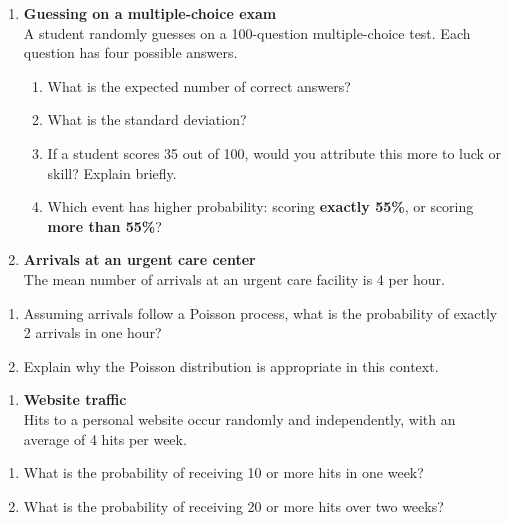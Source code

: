 \documentclass[
  letterpaper,
  DIV=11,
  numbers=noendperiod]{scrreprt}
\providecommand{\tightlist}{%
  \setlength{\itemsep}{0pt}\setlength{\parskip}{0pt}}
\begin{document}
\begin{enumerate}
\def\labelenumi{\arabic{enumi}.}
\setcounter{enumi}{8}
\item
  \textbf{Guessing on a multiple-choice exam}\\
  A student randomly guesses on a 100-question multiple-choice test.
  Each question has four possible answers.

  \begin{enumerate}
  \def\labelenumii{(\alph{enumii})}
  \tightlist
  \item
    What is the expected number of correct answers?\\
  \item
    What is the standard deviation?\\
  \item
    If a student scores 35 out of 100, would you attribute this more to
    luck or skill? Explain briefly.\\
  \item
    Which event has higher probability: scoring \textbf{exactly 55\%},
    or scoring \textbf{more than 55\%}?
  \end{enumerate}
\item
  \textbf{Arrivals at an urgent care center}\\
  The mean number of arrivals at an urgent care facility is 4 per hour.
\end{enumerate}

\begin{enumerate}
\def\labelenumi{(\alph{enumi})}
\tightlist
\item
  Assuming arrivals follow a Poisson process, what is the probability of
  exactly 2 arrivals in one hour?\\
\item
  Explain why the Poisson distribution is appropriate in this context.
\end{enumerate}

\begin{enumerate}
\def\labelenumi{\arabic{enumi}.}
\setcounter{enumi}{10}
\tightlist
\item
  \textbf{Website traffic}\\
  Hits to a personal website occur randomly and independently, with an
  average of 4 hits per week.
\end{enumerate}

\begin{enumerate}
\def\labelenumi{(\alph{enumi})}
\tightlist
\item
  What is the probability of receiving 10 or more hits in one week?\\
\item
  What is the probability of receiving 20 or more hits over two weeks?
\end{enumerate}
\end{document}
